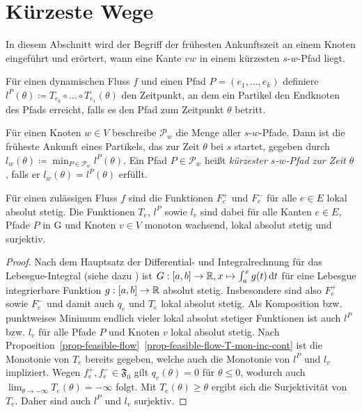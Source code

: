 \section{Kürzeste Wege}\label{sec-travel-times}

In diesem Abschnitt wird der Begriff der frühesten Ankunftszeit an einem Knoten eingeführt und erörtert, wann eine Kante $vw$ in einem kürzesten $s$-$w$-Pfad liegt.

\begin{definition}
	Für einen dynamischen Fluss $f$ und einen Pfad $P=(e_1,\dots,e_k)$ definiere $l^P(\theta)\coloneq T_{e_k}\circ\dots\circ T_{e_1}(\theta)$ den Zeitpunkt, an dem ein Partikel den Endknoten des Pfads erreicht, falls es den Pfad zum Zeitpunkt $\theta$ betritt.
	
	Für einen Knoten $w\in V$ beschreibe $\mathcal{P}_w$ die Menge aller $s$-$w$-Pfade.
	Dann ist die früheste Ankunft eines Partikels, das zur Zeit $\theta$ bei $s$ startet, gegeben durch $l_w(\theta)\coloneq \min_{P\in\mathcal{P}_w}l^P(\theta)$.
	Ein Pfad $P\in \mathcal{P}_w$ heißt \emph{kürzester $s$-$w$-Pfad zur Zeit $\theta$}, falls er $l_w(\theta)=l^P(\theta)$ erfüllt.
\end{definition}

\begin{proposition}\label{prop-abs-cont-sur}
	Für einen zulässigen Fluss $f$ sind die Funktionen $F_e^+$ und $F_e^-$ für alle $e\in E$ lokal absolut stetig.
	Die Funktionen $T_e$, $l^P$ sowie $l_v$ sind dabei für alle Kanten $e\in E$, Pfade $P$ in G und Knoten $v\in V$ monoton wachsend, lokal absolut stetig und surjektiv.
\end{proposition}
\begin{proof}
	Nach dem Hauptsatz der Differential- und Integralrechnung für das Lebesgue-Inte\-gral (siehe dazu \cite[Satz 4.14]{Elstrodt2011Abs}) ist $G: [a,b] \to \mathbb{R}, x\mapsto \int_a^x g(t) \mathop{}\!\mathrm{d} t$ für eine Lebesgue integrierbare Funktion $g: [a,b] \to \mathbb{R}$ absolut stetig.
	Insbesondere sind also $F_e^+$ sowie $F_e^-$ und damit auch $q_e$ und $T_e$ lokal absolut stetig.
	Als Komposition bzw. punktweises Minimum endlich vieler lokal absolut stetiger Funktionen ist auch $l^P$ bzw. $l_v$ für alle Pfade $P$ und Knoten $v$ lokal absolut stetig.
	Nach Proposition~\ref{prop-feasible-flow}~\ref{prop-feasible-flow-T-mon-inc-cont} ist die Monotonie von $T_e$ bereits gegeben, welche auch die Monotonie von $l^P$ und $l_v$ impliziert.
	Wegen $f_e^+, f_e^-\in\mathfrak{F_0}$ gilt $q_e(\theta)=0$ für $\theta\leq 0$, wodurch auch $\lim_{\theta\to-\infty} T_e(\theta) = - \infty$ folgt.
	Mit $T_e(\theta)\geq \theta$ ergibt sich die Surjektivität von $T_e$.
	Daher sind auch $l^P$ und $l_v$ surjektiv.
\end{proof}

